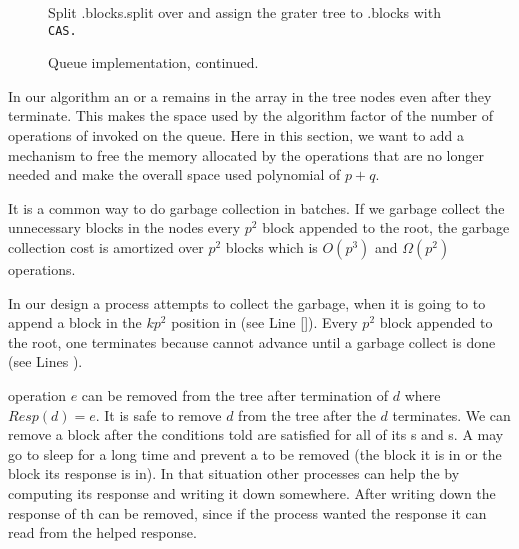 \begin{figure}
\begin{algorithmic}[1]
{
\State Split .blocks.split over  and assign the grater tree to .blocks with \tt{CAS}.
\State {}
\State {}
\EndIf
{}

}
\end{algorithmic}
\caption{\label{pseudocode2}Queue implementation, continued. }
\end{figure}


In our algorithm an  or a  remains in the  array in the tree nodes even after they terminate. This makes the space used by the algorithm factor of the number of operations of invoked on the queue. Here in this section, we want to add a mechanism to free the memory allocated by the operations that are no longer needed and make the overall space used polynomial of $p+q$.

It is a common way to do garbage collection in batches. If we garbage collect the unnecessary blocks in the nodes every $p^2$ block appended to the root, the garbage collection cost is amortized over $p^2$ blocks which is $O(p^3)$ and $\Omega(p^2)$ operations.

In our design a process attempts to collect the garbage, when it is going to to append a block in the $kp^2$ position in  (see Line \ref{}). Every $p^2$  block appended to the root, one  terminates because  cannot advance until a  garbage collect is done (see Lines ).

%

 operation $e$ can be removed from the tree after termination of  $d$ where $Resp(d)=e$. It is safe to remove  $d$ from the tree after the $d$ terminates. We can remove a block after the conditions told are satisfied for all of its s and s. A  may go to sleep for a long time and prevent a  to be removed (the block it is in or the block its response is in). In that situation other processes can help the  by computing its response and writing it down somewhere. After writing down the response of th  can be removed, since if the process wanted the response it can read from the helped response.

